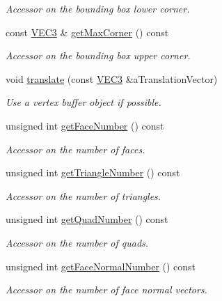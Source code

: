 \begin{DoxyCompactItemize}
\begin{DoxyCompactList}\small\item\em Accessor on the bounding box lower corner. \end{DoxyCompactList}\item 
const \hyperlink{class_math_1_1_vec3}{VEC3} \& \hyperlink{class_graphics_1_1_polygon_mesh_a23a7b423d853e16d043bb125161afcb0}{getMaxCorner} () const 
\begin{DoxyCompactList}\small\item\em Accessor on the bounding box upper corner. \end{DoxyCompactList}\item 
void \hyperlink{class_graphics_1_1_polygon_mesh_a4094c55d1009da88fb834e0957340c7c}{translate} (const \hyperlink{class_math_1_1_vec3}{VEC3} \&aTranslationVector)
\begin{DoxyCompactList}\small\item\em Use a vertex buffer object if possible. \end{DoxyCompactList}\item 
unsigned int \hyperlink{class_graphics_1_1_polygon_mesh_aa19d5b1760ae65457d646d4e6558dc43}{getFaceNumber} () const 
\begin{DoxyCompactList}\small\item\em Accessor on the number of faces. \end{DoxyCompactList}\item 
unsigned int \hyperlink{class_graphics_1_1_polygon_mesh_afea2475f1eb3e88bac083a2f79d3bb19}{getTriangleNumber} () const 
\begin{DoxyCompactList}\small\item\em Accessor on the number of triangles. \end{DoxyCompactList}\item 
unsigned int \hyperlink{class_graphics_1_1_polygon_mesh_a09109f7c34075d12c9837a183cc120ca}{getQuadNumber} () const 
\begin{DoxyCompactList}\small\item\em Accessor on the number of quads. \end{DoxyCompactList}\item 
unsigned int \hyperlink{class_graphics_1_1_polygon_mesh_a2848ccf95a11afb1912b760dd8fb85da}{getFaceNormalNumber} () const 
\begin{DoxyCompactList}\small\item\em Accessor on the number of face normal vectors. \end{DoxyCompactList}\item 

\end{DoxyCompactItemize}
